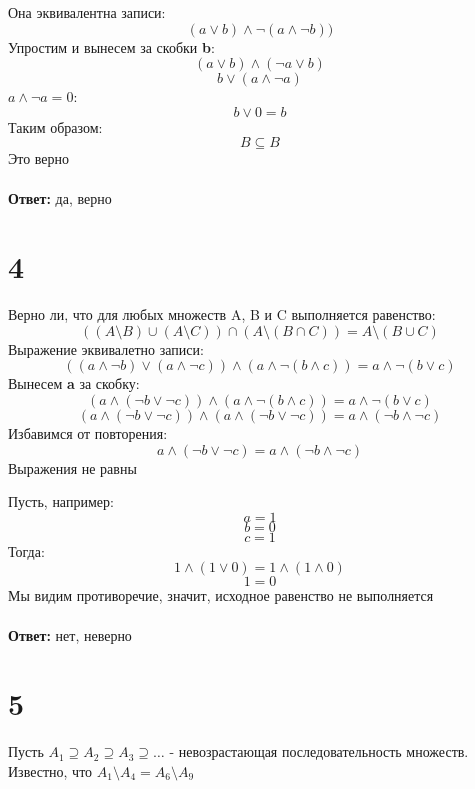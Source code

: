 \documentclass[a4paper,12pt]{article}
\begin{document}
Она эквивалентна записи:
\[
(a \vee b) \wedge \neg (a\wedge \neg b))
\]
Упростим и вынесем за скобки \textbf{b}:
\[
(a \vee b) \wedge (\neg a \vee b)
\]
\[
b \vee (a \wedge \neg a)
\]
$ a \wedge \neg a = 0$:
\[
b \vee 0 = b
\]
Таким образом:
\[
B \subseteq B
\]
Это верно\\\\
\textbf{Ответ:} да, верно
 \section*{4} 
Верно ли, что для любых множеств A, B и C выполняется равенство:
\[
((A \setminus B) \cup (A \setminus C)) \cap (A \setminus (B \cap C)) = A \setminus (B \cup C)
\]
Выражение эквивалетно записи:
\[
((a \wedge \neg b) \vee (a \wedge \neg c)) \wedge (a \wedge \neg (b \wedge c)) = a \wedge \neg (b \vee c)
\]
Вынесем \textbf{a} за скобку:
\[
(a \wedge (\neg b \vee \neg c)) \wedge ( a \wedge \neg(b \wedge c)) = a \wedge \neg (b \vee c)
\]
\[
(a \wedge (\neg b \vee \neg c)) \wedge ( a \wedge (\neg b \vee \neg c)) = a \wedge  (\neg b \wedge \neg  c)
\]
Избавимся от повторения:
\[
a \wedge (\neg b \vee \neg c) = a \wedge (\neg b \wedge \neg c)
\]
Выражения не равны

Пусть, например:
\[ a = 1\]
\[b = 0\]
\[c = 1\]
Тогда:
\[ 1 \wedge (1 \vee 0) = 1 \wedge (1 \wedge 0)
\]
\[
1 = 0
\]
Мы видим противоречие, значит, исходное равенство не выполняется\\\\
\textbf{Ответ:} нет, неверно
\section*{5}
Пусть $A_1 \supseteq A_2 \supseteq A_3 \supseteq \ldots  $ - невозрастающая последовательность множеств. Известно, что
$A_1 \setminus A_4  = A_6 \setminus A_9 $ 
\end{document}
